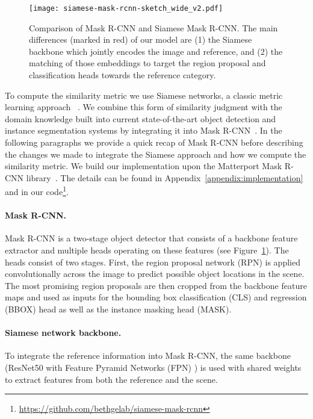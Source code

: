 \documentclass{article}
\begin{document}
\begin{figure}[t]
    \centering
    \texttt{[image: siamese-mask-rcnn-sketch\_wide\_v2.pdf]}
    \caption{Comparison of Mask R-CNN and Siamese Mask R-CNN. The main differences (marked in red) of our model are (1) the Siamese backbone which jointly encodes the image and reference, and (2) the matching of those embeddings to target the region proposal and classification heads towards the reference category.}
    \label{fig:siamese_mask_rcnn}
\end{figure}

To compute the similarity metric we use Siamese networks, a classic metric learning approach ~\cite{Bromley1993, Chopra2005, Koch2015}. We combine this form of similarity judgment with the domain knowledge built into current state-of-the-art object detection and instance segmentation systems by integrating it into Mask R-CNN~\cite{He2017}. In the following paragraphs we provide a quick recap of Mask R-CNN before describing the changes we made to integrate the Siamese approach and how we compute the similarity metric. We build our implementation upon the Matterport Mask R-CNN library~\cite{Abdulla2017}. The details can be found in Appendix~\ref{appendix:implementation} and in our code\footnote{\url{https://github.com/bethgelab/siamese-mask-rcnn}}.


\paragraph{Mask R-CNN.}

Mask R-CNN is a two-stage object detector that consists of a backbone feature extractor and multiple heads operating on these features (see Figure~\ref{fig:siamese_mask_rcnn}).
The heads consist of two stages. First, the region proposal network (RPN) is applied convolutionally across the image to predict possible object locations in the scene. The most promising region proposals are then cropped from the backbone feature maps and used as inputs for the bounding box classification (CLS) and regression (BBOX) head as well as the instance masking head (MASK).


\paragraph{Siamese network backbone.}

To integrate the reference information into Mask R-CNN, the same backbone (ResNet50 \cite{He2016} with Feature Pyramid Networks (FPN) \cite{Lin2017}) is used with shared weights to extract features from both the reference and the scene. 
\end{document}
